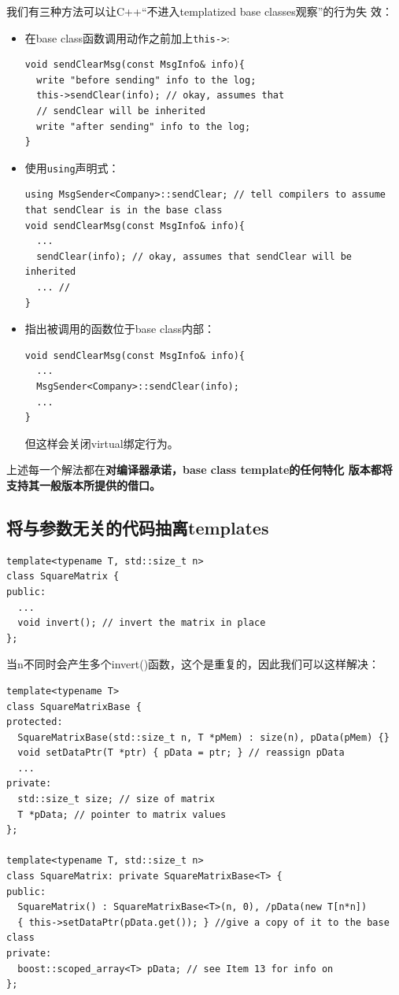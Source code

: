 我们有三种方法可以让C++“不进入templatized base classes观察”的行为失
效：
\begin{itemize}
\item 在base class函数调用动作之前加上\texttt{this->}:
\begin{verbatim}
void sendClearMsg(const MsgInfo& info){
  write "before sending" info to the log;
  this->sendClear(info); // okay, assumes that
  // sendClear will be inherited
  write "after sending" info to the log;
}
\end{verbatim}
\item 使用\texttt{using}声明式：
\begin{verbatim}
using MsgSender<Company>::sendClear; // tell compilers to assume that sendClear is in the base class
void sendClearMsg(const MsgInfo& info){
  ...
  sendClear(info); // okay, assumes that sendClear will be inherited
  ... // 
}
\end{verbatim}
\item 指出被调用的函数位于base class内部：
\begin{verbatim}
void sendClearMsg(const MsgInfo& info){
  ...
  MsgSender<Company>::sendClear(info);
  ... 
}
\end{verbatim}
  但这样会关闭virtual绑定行为。
\end{itemize}

上述每一个解法都在\textbf{对编译器承诺，base class template的任何特化
  版本都将支持其一般版本所提供的借口。}

\subsection{将与参数无关的代码抽离templates}
\label{sec:Item-44}

\begin{verbatim}
template<typename T, std::size_t n> 
class SquareMatrix {
public:
  ...
  void invert(); // invert the matrix in place
};
\end{verbatim}

当n不同时会产生多个invert()函数，这个是重复的，因此我们可以这样解决：
\begin{verbatim}
template<typename T>
class SquareMatrixBase {
protected:
  SquareMatrixBase(std::size_t n, T *pMem) : size(n), pData(pMem) {} 
  void setDataPtr(T *ptr) { pData = ptr; } // reassign pData
  ...
private:
  std::size_t size; // size of matrix
  T *pData; // pointer to matrix values
};

template<typename T, std::size_t n>
class SquareMatrix: private SquareMatrixBase<T> {
public:
  SquareMatrix() : SquareMatrixBase<T>(n, 0), /pData(new T[n*n])
  { this->setDataPtr(pData.get()); } //give a copy of it to the base class
private:
  boost::scoped_array<T> pData; // see Item 13 for info on
};
\end{verbatim}

